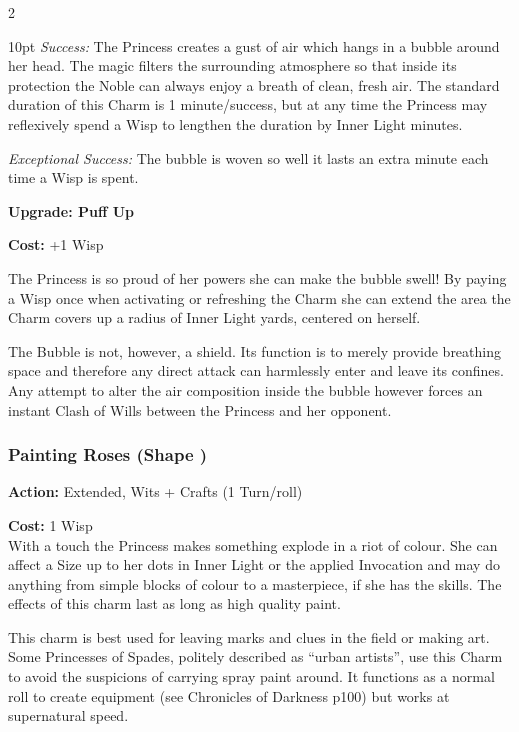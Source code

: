 \begin{multicols}{2}
\begin{myindentpar}{10pt}
\emph{Success:} The Princess creates a gust of air which hangs in a bubble around her head. The magic filters the surrounding atmosphere so that inside its protection the Noble can always enjoy a breath of clean, fresh air. The standard duration of this Charm is 1 minute/success, but at any time the Princess may reflexively spend a Wisp to lengthen the duration by Inner Light minutes.

\emph{Exceptional Success:} The bubble is woven so well it lasts an extra minute each time a Wisp is spent.

\textbf{Upgrade: Puff Up}

\noindent \textbf{Cost:} +1 Wisp

The Princess is so proud of her powers she can make the bubble swell! By paying a Wisp once when activating or refreshing the Charm she can extend the area the Charm covers up a radius of Inner Light yards, centered on herself.

The Bubble is not, however, a shield. Its function is to merely provide breathing space and therefore any direct attack can harmlessly enter and leave its confines. Any attempt to alter the air composition inside the bubble however forces an instant Clash of Wills between the Princess and her opponent.\end{myindentpar}


\subsubsection*{Painting Roses (Shape \textbullet)}

\noindent \textbf{Action:} Extended, Wits + Crafts (1 Turn/roll)

\noindent \textbf{Cost:} 1 Wisp \\

\noindent With a touch the Princess makes something explode in a riot of colour. She can affect a Size up to her dots in Inner Light or the applied Invocation and may do anything from simple blocks of colour to a masterpiece, if she has the skills. The effects of this charm last as long as high quality paint.

This charm is best used for leaving marks and clues in the field or making art. Some Princesses of Spades, politely described as \textquotedblleft urban artists\textquotedblright , use this Charm to avoid the suspicions of carrying spray paint around. It functions as a normal roll to create equipment (see Chronicles of Darkness p100) but works at supernatural speed.


\end{multicols}
